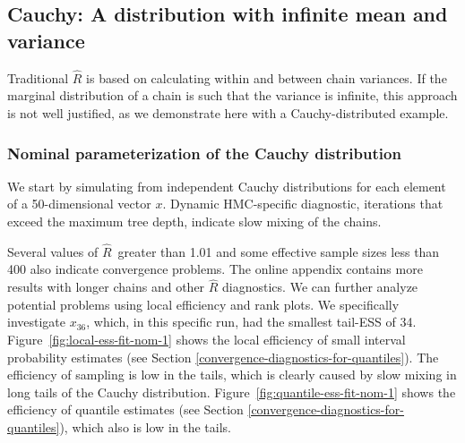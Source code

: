 \documentclass[american,]{article}
\newcommand{\Rhat}{$\widehat{R}$}
\theoremstyle{definition}
\begin{document}
\hypertarget{cauchy-a-distribution-with-infinite-mean-and-variance}{%
\subsection{Cauchy: A distribution with infinite mean and
variance}\label{cauchy-a-distribution-with-infinite-mean-and-variance}}

Traditional \(\widehat{R}\) is based on calculating
within and between chain variances. If the marginal distribution of a
chain is such that the variance is infinite,
this approach is not well justified, as we demonstrate here with a Cauchy-distributed example.

\hypertarget{nominal-parameterization-of-the-cauchy-distribution}{%
\subsubsection*{Nominal parameterization of the
Cauchy distribution}\label{nominal-parameterization-of-the-cauchy-distribution}}

We start by simulating  from  independent Cauchy distributions for each element of a 50-dimensional 
vector $x$. Dynamic HMC-specific diagnostic, iterations that exceed the maximum tree depth,
indicate slow mixing of the chains.


Several values of \Rhat\ greater than 1.01 and some effective sample sizes less than 400 also indicate convergence problems. The online appendix contains more results 
with longer chains and other \(\widehat{R}\) diagnostics.
%
We can further analyze potential problems using local efficiency and
rank plots. We specifically investigate \(x_{36}\), which, in this
specific run, had the smallest tail-ESS of 34. 
Figure~\ref{fig:local-ess-fit-nom-1} shows the local efficiency of small 
interval probability estimates (see Section \ref{convergence-diagnostics-for-quantiles}).
The efficiency of sampling is low in the tails, which is clearly
caused by slow mixing in long tails of the Cauchy distribution.  
%
Figure~\ref{fig:quantile-ess-fit-nom-1} shows the efficiency
of quantile estimates (see Section \ref{convergence-diagnostics-for-quantiles}), 
which also is low in the tails. 
\end{document}
